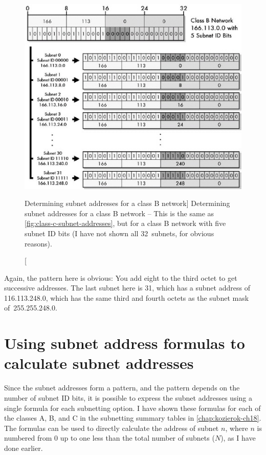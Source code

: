 \begin{figure}
   \centering
   \includegraphics[width=.9\textwidth]{images/class-b-subnet-addresses.jpg}
   \caption
      [Determining subnet addresses for a class B network]
      {Determining subnet addresses for a class B network --
      This is the same as \cref{fig:class-c-subnet-addresses}, but for a class B network with five subnet ID bits
      (I have not shown all 32~subnets, for obvious reasons).}
   \label{fig:class-b-subnet-addresses}
\end{figure}

Again, the pattern here is obvious: You add eight to the third octet to get successive addresses.
The last subnet here is 31, which has a subnet address of 116.113.248.0, which has the same third and fourth octets as the subnet mask of~255.255.248.0.




\section{Using subnet address formulas to calculate subnet addresses}

Since the subnet addresses form a pattern, and the pattern depends on the number of subnet ID bits, it is possible to express the subnet addresses using
a single formula for each subnetting option.
I have shown these formulas for each of the classes A, B, and C in the subnetting summary tables in \cref{chap:kozierok-ch18}.
The formulas can be used to directly calculate the address of subnet $n$, where $n$ is
numbered from 0 up to one less than the total number of subnets ($N$), as I have done earlier.

